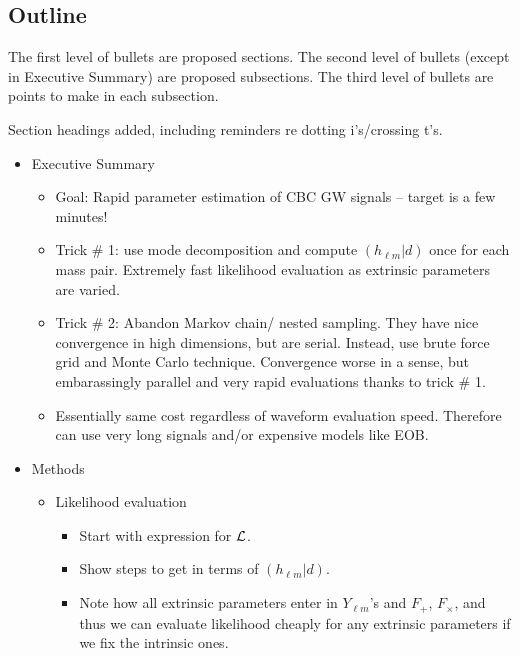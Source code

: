 \documentclass[twocolumn,prd,nofootinbib]{revtex4}
\begin{document}
\begin{widetext}
\section*{Outline}
The first level of bullets are proposed sections. 
The second level of bullets (except in Executive Summary) are proposed subsections.
The third level of bullets are points to make in each subsection.

Section headings added, including reminders re dotting i's/crossing t's.

\begin{itemize}
\item Executive Summary
	\begin{itemize}
	\item Goal: Rapid parameter estimation of CBC GW signals -- target is a few minutes!
	\item Trick \# 1: use mode decomposition and compute $( h_{\ell m} | d )$ once for each mass pair.
		Extremely fast likelihood evaluation as extrinsic parameters are varied.
	\item Trick \# 2: Abandon Markov chain/ nested sampling. They have nice convergence in high dimensions,
		but are serial. Instead, use brute force grid and Monte Carlo technique. Convergence worse in a sense,
		but embarassingly parallel and very rapid evaluations thanks to trick \# 1.
	\item Essentially same cost regardless of waveform evaluation speed. Therefore can use very long signals 
		and/or expensive models like EOB. 
	\end{itemize}

\item Methods
	\begin{itemize}
	\item Likelihood evaluation
		\begin{itemize}
		\item Start with expression for ${\cal L}$. 
		\item Show steps to get in terms of $( h_{\ell m} | d )$.
		\item Note how all extrinsic parameters enter in $Y_{\ell m}$'s and $F_+$, $F_\times$, and thus we can
			evaluate likelihood cheaply for any extrinsic parameters if we fix the intrinsic ones.
		\end{itemize}
		

\end{itemize}
\end{itemize}
\end{widetext}
\end{document}
